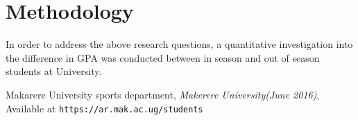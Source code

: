\documentclass[options]{article}
\begin{document}
\section{\textbf{Methodology}}
In order to address the above research questions, a quantitative investigation into
the difference in GPA was conducted between in season and out of season students
at University.





\begin{thebibliography}{10} Makarere University sports department, \emph{Makerere University(June 2016)}, Available at \texttt{https://ar.mak.ac.ug/students} \end{thebibliography}
\end{document}
